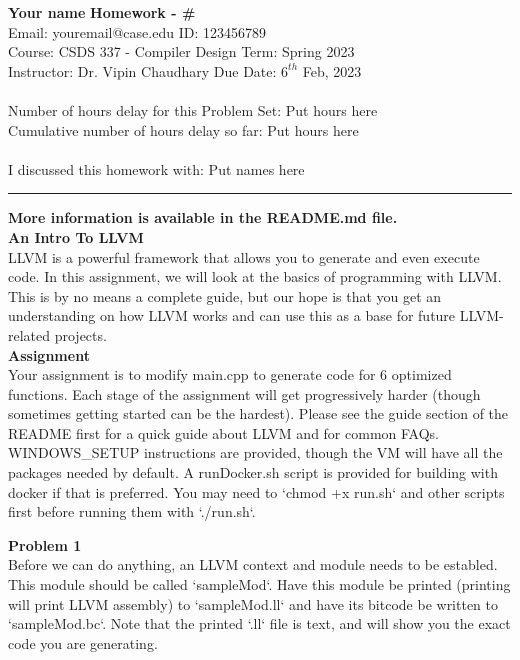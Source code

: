 \documentclass[a4paper, 11pt]{article}
\newenvironment{problem}[2][Problem]
    { \begin{mdframed}[backgroundcolor=gray!20] \textbf{#1 #2} \\}
    {  \end{mdframed}}
\begin{document}
\noindent
\large\textbf{Your name} \hfill \textbf{Homework - \#}   \\
Email: youremail@case.edu \hfill ID: 123456789 \\
\normalsize Course: CSDS 337 - Compiler Design \hfill Term: Spring 2023\\
Instructor: Dr. Vipin Chaudhary \hfill Due Date: $6^{th}$ Feb, 2023 \\ \\
Number of hours delay for this Problem Set: \hfill Put hours here\\
Cumulative number of hours delay so far: \hfill Put hours here \\ \\
I discussed this homework with: \hfill Put names here \\
\noindent\rule{7in}{2.8pt}

\large\textbf{More information is available in the README.md file. } \\

\large\textbf{An Intro To LLVM} \\
LLVM is a powerful framework that allows you to generate and even execute code. In this assignment, we will look at the basics of programming with LLVM. This is by no means a complete guide, but our hope is that you get an understanding on how LLVM works and can use this as a base for future LLVM-related projects. \\

\large\textbf{Assignment} \\
Your assignment is to modify main.cpp to generate code for 6 optimized functions.
Each stage of the assignment will get progressively harder (though sometimes getting started can be the hardest).
Please see the guide section of the README first for a quick guide about LLVM and for common FAQs.
WINDOWS\_SETUP instructions are provided, though the VM will have all the packages needed by default.
A runDocker.sh script is provided for building with docker if that is preferred.
You may need to `chmod +x run.sh` and other scripts first before running them with `./run.sh`. \\

\begin{problem}{1}
Before we can do anything, an LLVM context and module needs to be establed. This module should be called `sampleMod`. Have this module be printed (printing will print LLVM assembly) to `sampleMod.ll` and have its bitcode be written to `sampleMod.bc`. Note that the printed `.ll` file is text, and will show you the exact code you are generating.

\end{problem}
\end{document}
